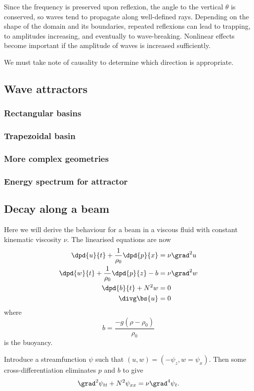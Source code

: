 Since the frequency is preserved upon reflexion, the angle to the vertical $\theta$ is conserved, so waves tend to propagate along well-defined rays. Depending on the shape of the domain and its boundaries, repeated reflexions can lead to trapping, to amplitudes increasing, and eventually to wave-breaking. Nonlinear effects become important if the amplitude of waves is increased sufficiently.

We must take note of causality to determine which direction is appropriate.

\subsection{Wave attractors}
\subsubsection{Rectangular basins}
\subsubsection{Trapezoidal basin}
\subsubsection{More complex geometries}
\subsubsection{Energy spectrum for attractor}

\subsection{Decay along a beam}

Here we will derive the behaviour for a beam in a viscous fluid with constant kinematic viscosity $\nu$. The linearised equations are now
\begin{align}
	\dpd{u}{t} + \frac{1}{\rho_0}\dpd{p}{x} &= \nu\grad^2 u \\
	\dpd{w}{t} + \frac{1}{\rho_0}\dpd{p}{z} - b &= \nu\grad^2 w \\
	\dpd{b}{t} + N^2w &= 0 \\
	\divg\bs{u} &= 0
\end{align}
where 
\begin{equation}
	b = \displaystyle\frac{-g(\rho-\rho_0)}{\rho_0}
\end{equation}
is the buoyancy. 

Introduce a streamfunction $\psi$ such that $(u,w) = (-\psi_z, w= \psi_x)$. Then some cross-differentiation eliminates $p$ and $b$ to give
\begin{equation}
	\grad^2 \psi_{tt} + N^2 \psi_{xx} = \nu\grad^4 \psi_t.
	\label{igw-damped}
\end{equation} 

